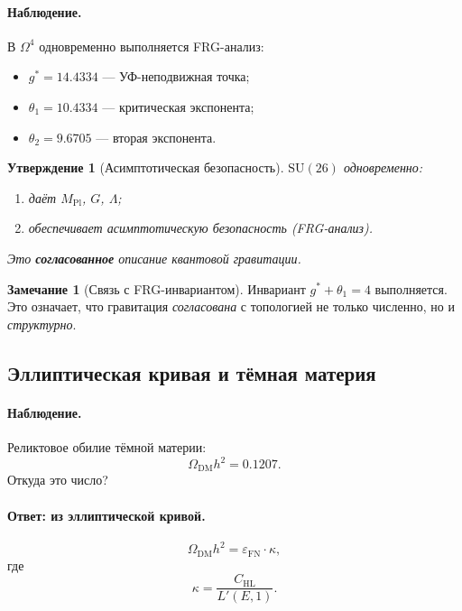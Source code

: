\documentclass[11pt,a4paper]{article}
\newcommand{\SU}{\mathrm{SU}}
\newcommand{\Om}{\Omega^4}
\newcommand{\Mpl}{M_{\text{Pl}}}
\newcommand{\epsFN}{\varepsilon_{\text{FN}}}
\newtheorem{proposition}[theorem]{Утверждение}
\theoremstyle{definition}
\newtheorem{remark}[theorem]{Замечание}
\begin{document}
\paragraph{Наблюдение.}
В $\Om$ одновременно выполняется FRG-анализ:
\begin{itemize}
    \item $g^* = 14.4334$ — УФ-неподвижная точка;
    \item $\theta_1 = 10.4334$ — критическая экспонента;
    \item $\theta_2 = 9.6705$ — вторая экспонента.
\end{itemize}

\begin{proposition}[Асимптотическая безопасность]
\label{prop:asymptotic-safety}
$\SU(26)$ одновременно:
\begin{enumerate}
    \item даёт $\Mpl$, $G$, $\Lambda$;
    \item обеспечивает асимптотическую безопасность 
          (FRG-анализ).
\end{enumerate}
Это \textbf{согласованное} описание квантовой гравитации.
\end{proposition}

\begin{remark}[Связь с FRG-инвариантом]
\label{rem:frg-invariant-link}
Инвариант $g^* + \theta_1 = 4$ выполняется. Это означает, 
что гравитация \emph{согласована} с топологией не только 
численно, но и \emph{структурно}.
\end{remark}

\subsection{Эллиптическая кривая и тёмная материя}
\label{subsec:elliptic-curve}

\paragraph{Наблюдение.}
Реликтовое обилие тёмной материи:
\begin{equation}
    \Omega_{\text{DM}} h^2 = 0.1207.
\end{equation}
Откуда это число?

\paragraph{Ответ: из эллиптической кривой.}
\begin{equation}
    \boxed{
    \Omega_{\text{DM}} h^2 = \epsFN \cdot \kappa,
    }
    \label{eq:omega-dm-kappa}
\end{equation}
где
\begin{equation}
    \kappa = \frac{C_{\text{HL}}}{L'(E,1)}.
    \label{eq:kappa}
\end{equation}
\end{document}
